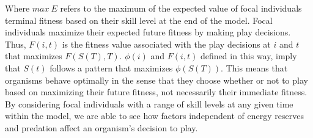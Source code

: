 \documentclass[12pt, letterpaper, fleqn]{article}
\begin{document}

    Where $max~E$ refers to the maximum of the expected value of focal individuals terminal fitness based on their skill level at the end of the model.
    Focal individuals maximize their expected future fitness by making play decisions. %
    Thus, $F(i,t)$ is the fitness value associated with the play decisions at $i$ and $t$ that maximizes $F(S(T),T)$. %
    $\phi(i)$ and $F(i,t)$ defined in this way, imply that $S(t)$ follows a pattern that maximizes $\phi(S(T))$. %
    This means that organisms behave optimally in the sense that they choose whether or not to play based on maximizing their future fitness, not necessarily their immediate fitness. %
    By considering focal individuals with a range of skill levels at any given time within the model, we are able to see how factors independent of energy reserves and predation affect an organism's decision to play.   
    
    
  
\end{document}
